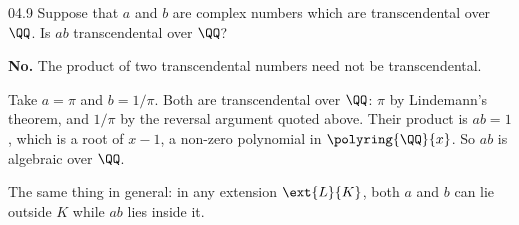 \documentclass[11pt]{article}
\begin{document}
\begin{problem}{04.9}
  Suppose that $a$ and $b$ are complex numbers which are transcendental over
  $\QQ$. Is $ab$ transcendental over $\QQ$?
\end{problem}
\begin{solution}
  \textbf{No.} The product of two transcendental numbers need not be
  transcendental.

  Take $a = \pi$ and $b = 1/\pi$. Both are transcendental over $\QQ$: $\pi$ by
  Lindemann's theorem, and $1/\pi$ by the reversal argument quoted above. Their
  product is $ab = 1$, which is a root of $x - 1$, a non-zero polynomial in
  $\polyring{\QQ}{x}$. So $ab$ is algebraic over $\QQ$.

  \medskip
  The same thing in general: in any extension $\ext{L}{K}$, both $a$ and $b$
  can lie outside $K$ while $ab$ lies inside it.
\end{solution}
\end{document}
